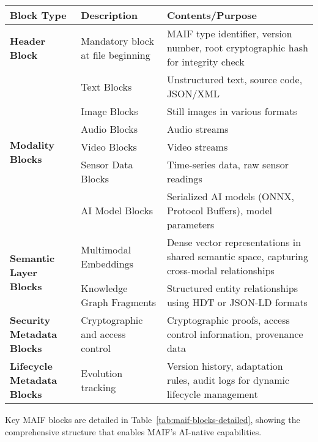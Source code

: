 \documentclass[conference]{IEEEtran}
\begin{document}
\begin{table*}[!t]
\renewcommand{\arraystretch}{1.3}
\caption{MAIF Block Types and Their Functions}
\label{tab:maif-blocks-detailed}
\centering
\footnotesize
\begin{tabular}{p{3cm}p{6cm}p{5cm}}
\toprule
\textbf{Block Type} & \textbf{Description} & \textbf{Contents/Purpose} \\
\midrule
\textbf{Header Block} & Mandatory block at file beginning & MAIF type identifier, version number, root cryptographic hash for integrity check \\
\midrule
\multirow{6}{3cm}{\textbf{Modality Blocks}} & Text Blocks & Unstructured text, source code, JSON/XML \\
& Image Blocks & Still images in various formats \\
& Audio Blocks & Audio streams \\
& Video Blocks & Video streams \\
& Sensor Data Blocks & Time-series data, raw sensor readings \\
& AI Model Blocks & Serialized AI models (ONNX, Protocol Buffers), model parameters\cite{ref41} \\
\midrule
\multirow{2}{3cm}{\textbf{Semantic Layer Blocks}} & Multimodal Embeddings & Dense vector representations in shared semantic space, capturing cross-modal relationships\cite{ref26} \\
& Knowledge Graph Fragments & Structured entity relationships using HDT or JSON-LD formats\cite{ref42} \\
\midrule
\textbf{Security Metadata Blocks} & Cryptographic and access control & Cryptographic proofs, access control information, provenance data \\
\midrule
\textbf{Lifecycle Metadata Blocks} & Evolution tracking & Version history, adaptation rules, audit logs for dynamic lifecycle management\cite{ref12} \\
\bottomrule
\end{tabular}
\end{table*}

Key MAIF blocks are detailed in Table~\ref{tab:maif-blocks-detailed}, showing the comprehensive structure that enables MAIF's AI-native capabilities.
\end{document}
